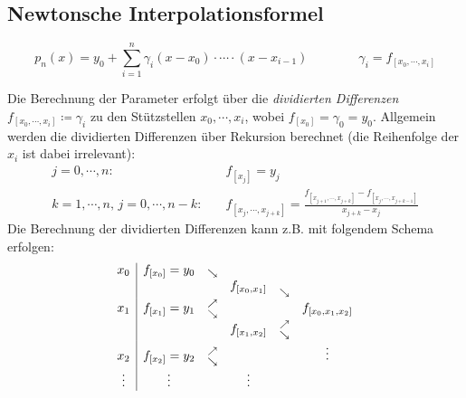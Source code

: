 	\subsection{Newtonsche Interpolationsformel}
		\begin{equation*}
			p_n(x) = y_0 + \sum_{i=1}^n \gamma_i (x - x_0) \cdot \cdots \cdot (x - x_{i-1}) \qquad\qquad \gamma_i = f_{[x_0, \cdots, x_i]}
		\end{equation*}

		Die Berechnung der Parameter erfolgt über die \textit{dividierten Differenzen} \( f_{[x_0, \cdots, x_i]} \coloneqq \gamma_i \) zu den Stützstellen \( x_0, \cdots, x_i \), wobei \( f_{[x_0]} = \gamma_0 = y_0 \). Allgemein werden die dividierten Differenzen über Rekursion berechnet (die Reihenfolge der \(x_i\) ist dabei irrelevant):
		\begin{align*}
			j = 0, \cdots, n:                         & \quad f_{[x_j]} = y_j                                                                                                      \\
			k = 1, \cdots, n,\, j = 0, \cdots, n - k: & \quad f_{[x_j, \cdots, x_{j+k}]} = \frac{f_{[x_{j + 1}, \cdots, x_{j+k}]} - f_{[x_j, \cdots, x_{j+k-1}]}}{{x_{j+k} - x_j}}
		\end{align*}
		Die Berechnung der dividierten Differenzen kann z.B. mit folgendem Schema erfolgen:
		\begin{equation*}
			\begin{array}{c | ccccc}
				x_0    & f_{[x_0]} = y_0 & \raisebox{-4pt}{\( \overset{\searrow}{} \)}                     &                                                                                                        \\
				       &                 &                                                                 & f_{[x_0, x_1]} & \raisebox{-7pt}{\( \overset{\searrow}{} \)}                     &                     \\
				x_1    & f_{[x_1]} = y_1 & \raisebox{-6pt}{\( \overset{\nearrow}{\overset{\searrow}{}} \)} &                &                                                                 & f_{[x_0, x_1, x_2]} \\
				       &                 &                                                                 & f_{[x_1, x_2]} & \raisebox{-6pt}{\( \overset{\nearrow}{\overset{\searrow}{}} \)} &                     \\
				x_2    & f_{[x_2]} = y_2 & \raisebox{-6pt}{\( \overset{\nearrow}{\overset{\searrow}{}} \)} &                &                                                                 & \vdots              \\
				\vdots & \vdots          &                                                                 & \vdots         &
			\end{array}
		\end{equation*}

